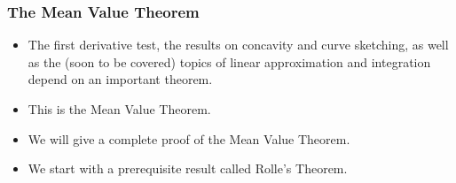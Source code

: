 \begin{frame}
\frametitle{The Mean Value Theorem}
\begin{itemize}
\item The first derivative test, the results on concavity and curve sketching, as well as the (soon to be covered) topics of linear approximation and integration depend on an important theorem.
\item This is the Mean Value Theorem.
\item We will give a complete proof of the Mean Value Theorem.
\item We start with a prerequisite result called Rolle's Theorem.
\end{itemize}
\end{frame}
